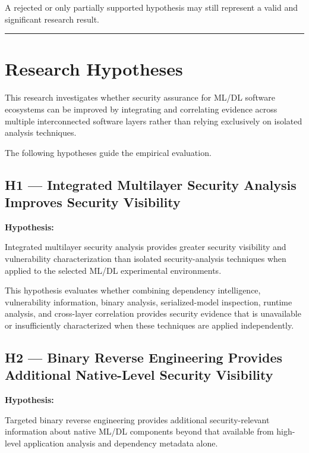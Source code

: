 \documentclass[
  12pt,
  letterpaper,
  oneside]{report}
\begin{document}
A rejected or only partially supported hypothesis may still represent a
valid and significant research result.

\begin{center}\rule{0.5\linewidth}{0.5pt}\end{center}

\section{Research Hypotheses}\label{1111-research-hypotheses}

This research investigates whether security assurance for ML/DL software
ecosystems can be improved by integrating and correlating evidence
across multiple interconnected software layers rather than relying
exclusively on isolated analysis techniques.

The following hypotheses guide the empirical evaluation.

\subsection{H1 --- Integrated Multilayer Security Analysis Improves
Security
Visibility}\label{h1--integrated-multilayer-security-analysis-improves-security-visibility}

\textbf{Hypothesis:}

Integrated multilayer security analysis provides greater security
visibility and vulnerability characterization than isolated
security-analysis techniques when applied to the selected ML/DL
experimental environments.

This hypothesis evaluates whether combining dependency intelligence,
vulnerability information, binary analysis, serialized-model inspection,
runtime analysis, and cross-layer correlation provides security evidence
that is unavailable or insufficiently characterized when these
techniques are applied independently.

\subsection{H2 --- Binary Reverse Engineering Provides Additional
Native-Level Security
Visibility}\label{h2--binary-reverse-engineering-provides-additional-native-level-security-visibility}

\textbf{Hypothesis:}

Targeted binary reverse engineering provides additional
security-relevant information about native ML/DL components beyond that
available from high-level application analysis and dependency metadata
alone.
\end{document}
